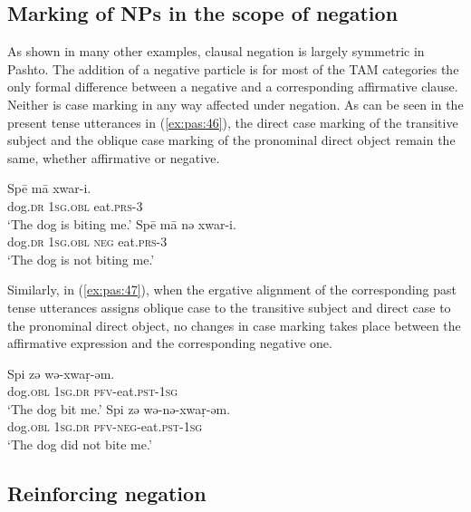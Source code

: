 \documentclass[output=paper,colorlinks,citecolor=brown]{langscibook}
\begin{document}
\subsection{Marking of NPs in the scope of negation}\label{sec:pas:4.3}

As shown in many other examples, clausal negation is largely symmetric in Pashto. The addition of a negative particle is for most of the TAM categories the only formal difference between a negative and a corresponding affirmative clause. Neither is case marking in any way affected under negation. As can be seen in the present tense utterances in (\ref{ex:pas:46}), the direct case marking of the transitive subject and the oblique case marking of the pronominal direct object remain the same, whether affirmative or negative.

\ea\label{ex:pas:46}
    \ea\label{ex:pas:46a}
        \gll Spē  mā xwar-i.\\
             dog.\textsc{dr} \textsc{1sg.obl} eat.\textsc{prs-3} \\
        \glt ‘The dog is biting me.’
    \ex\label{ex:pas:46b}
        \gll Spē mā nə xwar-i.\\
            dog.\textsc{dr} \textsc{1sg.obl} \textsc{neg} eat.\textsc{prs-3} \\
        \glt ‘The dog is not biting me.’
    \z
\z 

Similarly, in (\ref{ex:pas:47}), when the ergative alignment of the corresponding past tense utterances assigns oblique case to the transitive subject and direct case to the pronominal direct object, no changes in case marking takes place between the affirmative expression and the corresponding negative one.

\ea\label{ex:pas:47}
    \ea\label{ex:pas:47a}
        \gll Spi zə wə-xwaṛ-əm.\\
             dog.\textsc{obl} \textsc{1sg.dr} \textsc{pfv}{}-eat.\textsc{pst-1sg}  \\
        \glt ‘The dog bit me.’
    \ex\label{ex:pas:47b}
        \gll Spi zə wə-nə-xwaṛ-əm.\\
          dog.\textsc{obl} \textsc{1sg.dr} \textsc{pfv}{}-\textsc{neg}{}-eat.\textsc{pst-1sg}\\
        \glt ‘The dog did not bite me.’
    \z
\z 

\subsection{Reinforcing negation}\label{sec:pas:4.4}
\end{document}

